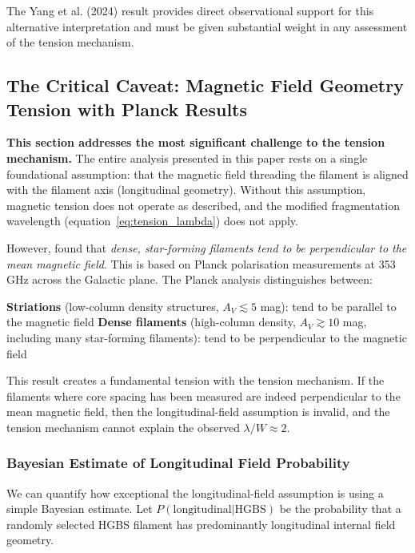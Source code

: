 \documentclass[11pt,a4paper]{article}
\begin{document}
The Yang et al. (2024) result provides direct observational support for this alternative interpretation and must be given substantial weight in any assessment of the tension mechanism.

\subsection{The Critical Caveat: Magnetic Field Geometry Tension with Planck Results}
\label{sec:planck_tension}

\textbf{This section addresses the most significant challenge to the tension mechanism.} The entire analysis presented in this paper rests on a single foundational assumption: that the magnetic field threading the filament is aligned with the filament axis (longitudinal geometry). Without this assumption, magnetic tension does not operate as described, and the modified fragmentation wavelength (equation~\ref{eq:tension_lambda}) does not apply.

However, \cite{Planck2016} found that \emph{dense, star-forming filaments tend to be perpendicular to the mean magnetic field}. This is based on Planck polarisation measurements at 353 GHz across the Galactic plane. The Planck analysis distinguishes between:
\begin{itemize}
    \textbf{Striations} (low-column density structures, $A_V \lesssim 5$ mag): tend to be parallel to the magnetic field
    \textbf{Dense filaments} (high-column density, $A_V \gtrsim 10$ mag, including many star-forming filaments): tend to be perpendicular to the magnetic field
\end{itemize}

This result creates a fundamental tension with the tension mechanism. If the filaments where core spacing has been measured are indeed perpendicular to the mean magnetic field, then the longitudinal-field assumption is invalid, and the tension mechanism cannot explain the observed $\lambda/W \approx 2$.

\subsubsection{Bayesian Estimate of Longitudinal Field Probability}

We can quantify how exceptional the longitudinal-field assumption is using a simple Bayesian estimate. Let $P(\text{longitudinal}|\text{HGBS})$ be the probability that a randomly selected HGBS filament has predominantly longitudinal internal field geometry.
\end{document}

